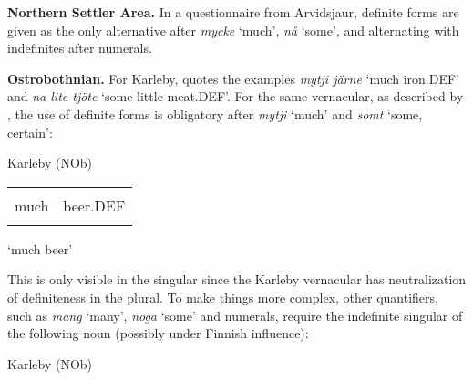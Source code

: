 \begin{styleBodytextC}
\textbf{Northern Settler Area. }In a questionnaire from Arvidsjaur, definite forms are given as the only alternative after \textit{mycke} ‘much’, \textit{nå} ‘some’, and alternating with indefinites after numerals.

\end{styleBodytextC}

\begin{styleBodytextC}
\textbf{Ostrobothnian.} For Karleby, \citet[94]{Hagfors1891} quotes the examples \textit{mytji järne} ‘much iron.DEF’ and \textit{na lite tjöte} ‘some little meat.DEF’. For the same vernacular, as described by \citet{Vangsnes2003}, the use of definite forms is obligatory after \textit{mytji} ‘much’ and \textit{somt} ‘some, certain’:

\end{styleBodytextC}

\begin{listWWNumileveli}
\item 

\begin{styleExample}
Karleby (NOb)

\end{styleExample}

\end{listWWNumileveli}

\begin{tabular}{ll}
\lsptoprule
\multicolumn{2}{l}{mytji

}\\
much & beer.DEF\\
\lspbottomrule
\end{tabular}

\begin{styleTranslation}
‘much beer’

\end{styleTranslation}

\begin{styleBodyTextFirst}
This is only visible in the singular since the Karleby vernacular has neutralization of definiteness in the plural. To make things more complex, other quantifiers, such as \textit{mang} ‘many’, \textit{noga} ‘some’ and numerals, require the indefinite singular of the following noun (possibly under Finnish influence):

\end{styleBodyTextFirst}

\begin{listWWNumileveli}
\item 

\begin{styleExample}
Karleby (NOb)

\end{styleExample}

\end{listWWNumileveli}

